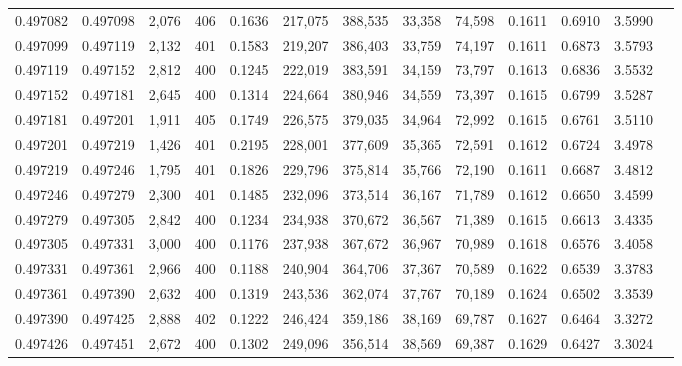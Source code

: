 \begin{tabular}{rrrrrrrrrrrrr}
0.497082 & 0.497098 & 2,076 & 406 &                                     0.1636 & 217,075 & 388,535 &  33,358 &  74,598 & 0.1611 & 0.6910 & 3.5990 \\
0.497099 & 0.497119 & 2,132 & 401 &                                     0.1583 & 219,207 & 386,403 &  33,759 &  74,197 & 0.1611 & 0.6873 & 3.5793 \\
0.497119 & 0.497152 & 2,812 & 400 &                                     0.1245 & 222,019 & 383,591 &  34,159 &  73,797 & 0.1613 & 0.6836 & 3.5532 \\
0.497152 & 0.497181 & 2,645 & 400 &                                     0.1314 & 224,664 & 380,946 &  34,559 &  73,397 & 0.1615 & 0.6799 & 3.5287 \\
0.497181 & 0.497201 & 1,911 & 405 &                                     0.1749 & 226,575 & 379,035 &  34,964 &  72,992 & 0.1615 & 0.6761 & 3.5110 \\
0.497201 & 0.497219 & 1,426 & 401 &                                     0.2195 & 228,001 & 377,609 &  35,365 &  72,591 & 0.1612 & 0.6724 & 3.4978 \\
0.497219 & 0.497246 & 1,795 & 401 &                                     0.1826 & 229,796 & 375,814 &  35,766 &  72,190 & 0.1611 & 0.6687 & 3.4812 \\
0.497246 & 0.497279 & 2,300 & 401 &                                     0.1485 & 232,096 & 373,514 &  36,167 &  71,789 & 0.1612 & 0.6650 & 3.4599 \\
0.497279 & 0.497305 & 2,842 & 400 &                                     0.1234 & 234,938 & 370,672 &  36,567 &  71,389 & 0.1615 & 0.6613 & 3.4335 \\
0.497305 & 0.497331 & 3,000 & 400 &                                     0.1176 & 237,938 & 367,672 &  36,967 &  70,989 & 0.1618 & 0.6576 & 3.4058 \\
0.497331 & 0.497361 & 2,966 & 400 &                                     0.1188 & 240,904 & 364,706 &  37,367 &  70,589 & 0.1622 & 0.6539 & 3.3783 \\
0.497361 & 0.497390 & 2,632 & 400 &                                     0.1319 & 243,536 & 362,074 &  37,767 &  70,189 & 0.1624 & 0.6502 & 3.3539 \\
0.497390 & 0.497425 & 2,888 & 402 &                                     0.1222 & 246,424 & 359,186 &  38,169 &  69,787 & 0.1627 & 0.6464 & 3.3272 \\
0.497426 & 0.497451 & 2,672 & 400 &                                     0.1302 & 249,096 & 356,514 &  38,569 &  69,387 & 0.1629 & 0.6427 & 3.3024 \\

\end{tabular}
